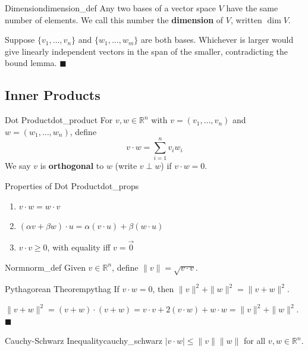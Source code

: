 \documentclass[11pt, letterpaper, openany]{book}
\renewenvironment{proof}[1][\proofname]{%
  \tcolorbox[blanker, breakable, left=1em,
    before skip=1em, after skip=1em,
    borderline west={2pt}{0pt}{MagicTeal!50},
    colback=MagicCream,
    before upper={\textcolor{MagicTeal}{\sffamily\bfseries #1.}\space}
  ]%
}{%
  \hfill\textcolor{MagicTeal}{\ensuremath{\blacksquare}}\endtcolorbox%
}
\begin{document}
\begin{defn}{Dimension}{dimension_def}
Any two bases of a vector space $V$ have the same number of elements. We call this number the \textbf{dimension} of $V$, written $\dim V$.
\end{defn}

\begin{proof}[Proof that dimension is well-defined]
Suppose $\{v_1, \ldots, v_n\}$ and $\{w_1, \ldots, w_m\}$ are both bases. Whichever is larger would give linearly independent vectors in the span of the smaller, contradicting the bound lemma.
\end{proof}

\subsection{Inner Products}

\begin{defn}{Dot Product}{dot_product}
For $v, w \in \mathbb{R}^n$ with $v = (v_1, \ldots, v_n)$ and $w = (w_1, \ldots, w_n)$, define
\[v \cdot w = \sum_{i=1}^n v_i w_i\]
We say $v$ is \textbf{orthogonal} to $w$ (write $v \perp w$) if $v \cdot w = 0$.
\end{defn}

\begin{thm}{Properties of Dot Product}{dot_props}
\begin{enumerate}
    \item $v \cdot w = w \cdot v$
    \item $(\alpha v + \beta w) \cdot u = \alpha(v \cdot u) + \beta(w \cdot u)$
    \item $v \cdot v \geq 0$, with equality iff $v = \vec{0}$
\end{enumerate}
\end{thm}

\begin{defn}{Norm}{norm_def}
Given $v \in \mathbb{R}^n$, define $\|v\| = \sqrt{v \cdot v}$.
\end{defn}

\begin{thm}{Pythagorean Theorem}{pythag}
If $v \cdot w = 0$, then $\|v\|^2 + \|w\|^2 = \|v + w\|^2$.
\end{thm}

\begin{proof}
$\|v + w\|^2 = (v + w) \cdot (v + w) = v \cdot v + 2(v \cdot w) + w \cdot w = \|v\|^2 + \|w\|^2$.
\end{proof}

\begin{thm}{Cauchy-Schwarz Inequality}{cauchy_schwarz}
$|v \cdot w| \leq \|v\| \|w\|$ for all $v, w \in \mathbb{R}^n$.
\end{thm}
\end{document}
